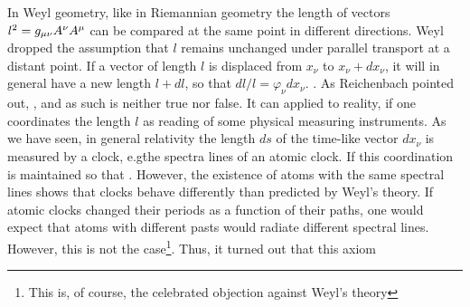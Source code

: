 \documentclass[draft]{article}
\newcommand{\phin}{\ensuremath{\varphi_\nu}\xspace}
\newcommand{\WT}{Weyl's theory\xspace}
\begin{document}

\begin{W}
\item\label{W1} In Weyl geometry, like in Riemannian geometry the length of vectors  $l^2=g_{\mu\nu} A^\nu A^\mu$ can be compared at the same point in different directions. Weyl dropped the assumption that $l$ remains unchanged under parallel transport at a distant point. If a vector of length $l$ is displaced from $x_\nu$ to $x_\nu+dx_\nu$, it will in general have a new length $l+dl$, so that $dl/l=\phin dx_\nu$. . As Reichenbach pointed out,  \citep[366]{Reichenbach1922a}, and as such is neither true nor false. It can applied to reality, if one coordinates the length $l$ as reading of some physical measuring instruments. As we have seen, in general relativity the length $ds$ of the time-like vector $dx_\nu$ is measured by a clock, e.g\. the spectra lines of an atomic clock. If this coordination is maintained so that  \citep[366]{Reichenbach1922a}. However, the existence of atoms with the same spectral lines shows that clocks behave differently than predicted by \WT. If atomic clocks changed their periods as a function of their \spti paths, one would expect that atoms with different pasts would radiate different spectral lines. However, this is not the case\footnote{This is, of course, the celebrated objection against \WT {}}. Thus, it turned out that this axiom   \citep[366]{Reichenbach1922a}


\end{W}
\end{document}

